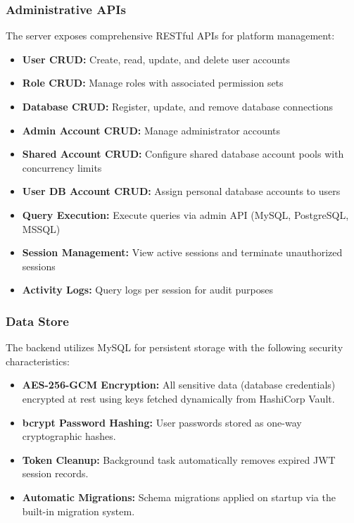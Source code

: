 \subsubsection{Administrative APIs}

The server exposes comprehensive RESTful APIs for platform management:
\begin{itemize}
    \item \textbf{User CRUD:} Create, read, update, and delete user accounts
    \item \textbf{Role CRUD:} Manage roles with associated permission sets
    \item \textbf{Database CRUD:} Register, update, and remove database connections
    \item \textbf{Admin Account CRUD:} Manage administrator accounts
    \item \textbf{Shared Account CRUD:} Configure shared database account pools with concurrency limits
    \item \textbf{User DB Account CRUD:} Assign personal database accounts to users
    \item \textbf{Query Execution:} Execute queries via admin API (MySQL, PostgreSQL, MSSQL)
    \item \textbf{Session Management:} View active sessions and terminate unauthorized sessions
    \item \textbf{Activity Logs:} Query logs per session for audit purposes
\end{itemize}

\subsubsection{Data Store}

The backend utilizes MySQL for persistent storage with the following security characteristics:
\begin{itemize}
    \item \textbf{AES-256-GCM Encryption:} All sensitive data (database credentials) encrypted at rest using keys fetched dynamically from HashiCorp Vault.
    \item \textbf{bcrypt Password Hashing:} User passwords stored as one-way cryptographic hashes.
    \item \textbf{Token Cleanup:} Background task automatically removes expired JWT session records.
    \item \textbf{Automatic Migrations:} Schema migrations applied on startup via the built-in migration system.
\end{itemize}

